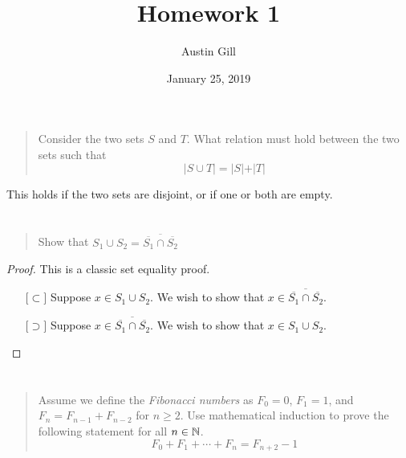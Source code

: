 \documentclass{article}
\title{Homework 1}
\author{Austin Gill}
\date{January 25, 2019}
\begin{document}
\maketitle

\section{}
\begin{quote}
    Consider the two sets $S$ and $T$. What relation must hold between the
    two sets such that
    \[\vert S \cup T \vert = \vert S \vert + \vert T \vert \]
\end{quote}
This holds if the two sets are disjoint, or if one or both are empty.

\section{}
\begin{quote}
    Show that $S_1 \cup S_2 = \overline{\overline{S_1} \cap \overline{S_2}}$
\end{quote}

\begin{proof}
    This is a classic set equality proof.
    \begin{itemize}
        \item[$\lbrack\subset\rbrack$] Suppose $x \in S_1 \cup S_2$. We wish to show that $x \in
                  \overline{\overline{S_1} \cap \overline{S_2}}$.
        \item[$\lbrack\supset\rbrack$] Suppose $x \in \overline{\overline{S_1} \cap
                      \overline{S_2}}$. We wish to show that $x \in S_1 \cup S_2$.
    \end{itemize}
\end{proof}


\section{}
\begin{quote}
    Assume we define the \textit{Fibonacci numbers} as $F_0 = 0$, $F_1 = 1$,
    and $F_n = F_{n-1} + F_{n-2}$ for $n \geq 2$. Use mathematical induction to
    prove the following statement for all $n \in \mathbb{N}$.
    \[F_0 + F_1 + \cdots + F_n = F_{n + 2} - 1\]
\end{quote}
\end{document}
